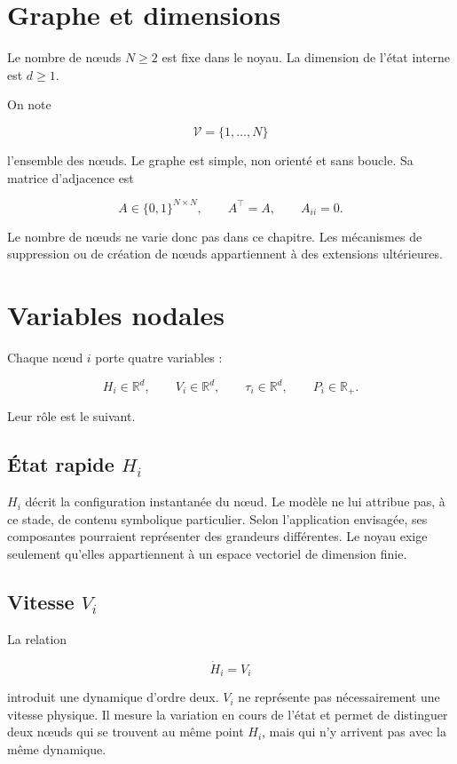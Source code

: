 \section{Graphe et dimensions}\label{t1-graphe-et-dimensions}

Le nombre de nœuds \(N\geq 2\) est fixe dans le noyau. La dimension de l'état interne est \(d\geq 1\).

On note

\[
\mathcal V=\{1,\ldots,N\}
\]

l'ensemble des nœuds. Le graphe est simple, non orienté et sans boucle. Sa matrice d'adjacence est

\[
A\in\{0,1\}^{N\times N},
\qquad
A^\top=A,
\qquad
A_{ii}=0.
\]

Le nombre de nœuds ne varie donc pas dans ce chapitre. Les mécanismes de suppression ou de création de nœuds appartiennent à des extensions ultérieures.

\section{Variables nodales}\label{t1-variables-nodales}

Chaque nœud \(i\) porte quatre variables :

\[
H_i\in\mathbb R^d,
\qquad
V_i\in\mathbb R^d,
\qquad
\tau_i\in\mathbb R^d,
\qquad
P_i\in\mathbb R_+.
\]

Leur rôle est le suivant.

\subsection{État rapide \texorpdfstring{\(H_i\)}{Hi}}\label{t1-etat-rapide-h_i}

\(H_i\) décrit la configuration instantanée du nœud. Le modèle ne lui attribue pas, à ce stade, de contenu symbolique particulier. Selon l'application envisagée, ses composantes pourraient représenter des grandeurs différentes. Le noyau exige seulement qu'elles appartiennent à un espace vectoriel de dimension finie.

\subsection{Vitesse \texorpdfstring{\(V_i\)}{Vi}}\label{t1-vitesse-v_i}

La relation

\[
\dot H_i=V_i
\]

introduit une dynamique d'ordre deux. \(V_i\) ne représente pas nécessairement une vitesse physique. Il mesure la variation en cours de l'état et permet de distinguer deux nœuds qui se trouvent au même point \(H_i\), mais qui n'y arrivent pas avec la même dynamique.

